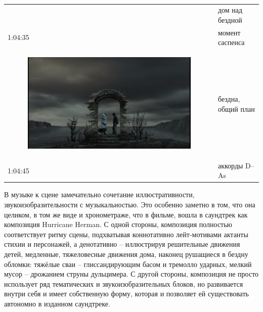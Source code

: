 \begin{longtable}[]{@{}ll@{}}
\begin{minipage}[t]{0.39\columnwidth}
\begin{figure}
\caption{}
\end{figure}
\strut
\end{minipage} & \begin{minipage}[t]{0.31\columnwidth}\raggedright\strut
дом над бездной\strut
\end{minipage}\tabularnewline
\begin{minipage}[t]{0.39\columnwidth}\raggedright\strut
1:04:35\strut
\end{minipage} & \begin{minipage}[t]{0.31\columnwidth}\raggedright\strut
момент саспенса\strut
\end{minipage}\tabularnewline
\begin{minipage}[t]{0.39\columnwidth}\raggedright\strut
\begin{figure}
\centering
\includegraphics{IMG/LS_HH_Abyss.png}
\caption{}
\end{figure}
\strut
\end{minipage} & \begin{minipage}[t]{0.31\columnwidth}\raggedright\strut
бездна, общий план\strut
\end{minipage}\tabularnewline
\begin{minipage}[t]{0.39\columnwidth}\raggedright\strut
1:04:45\strut
\end{minipage} & \begin{minipage}[t]{0.31\columnwidth}\raggedright\strut
аккорды D--As\strut
\end{minipage}\tabularnewline
\bottomrule
\end{longtable}

В музыке к сцене замечательно сочетание иллюстративности, звукоизобразительности с музыкальностью.
Это особенно заметно в том, что она целиком, в том же виде и хронометраже, что в фильме, вошла в саундтрек как композиция Hurricane Herman.
С одной стороны, композиция полностью соответствует ритму сцены, подхватывая коннотативно лейт-мотивами актанты стихии и персонажей, а денотативно -- иллюстрируя решительные движения детей, медленные, тяжеловесные движения дома, наконец рушащиеся в бездну обломки: тяжёлые сваи -- глиссандирующим басом и тремолло ударных, мелкий мусор -- дрожанием струны дульцимера.
С другой стороны, композиция не просто использует ряд тематических и звукоизобразительных блоков, но развивается внутри себя и имеет собственную форму, которая и позволяет ей существовать автономно в изданном саундтреке.

